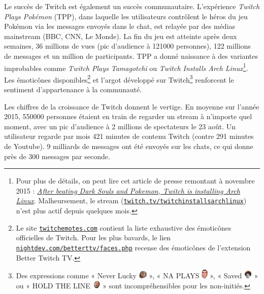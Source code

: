 \documentclass[a4paper]{article}
\begin{document}
Le succès de Twitch est également un succès communautaire. L'expérience \textit{Twitch Plays Pokémon} (TPP), dans laquelle les utilisateurs contrôlent le héros du jeu Pokémon via les messages envoyés dans le chat, est relayée par des médias mainstream (BBC, CNN, Le Monde). La fin du jeu est atteinte après deux semaines, 36 millions de vues (pic d'audience à 121000 personnes), 122 millions de messages et un million de participants\cite{Gadget2014}. TPP a donné naissance à des variantes improbables comme \textit{Twitch Plays Tamagotchi} ou \textit{Twitch Installs Arch Linux}\footnote{Pour plus de détails, on peut lire cet article de presse remontant à novembre 2015 : \href{http://www.pcworld.com/article/3001378/operating-systems/after-beating-dark-souls-and-pokemon-twitch-is-installing-arch-linux.html}{\textit{After beating Dark Souls and Pokemon, Twitch is installing Arch Linux}}. Malheursement, le stream (\href{https://www.twitch.tv/twitchinstallsarchlinux}{\texttt{twitch.tv/twitchinstallsarchlinux}}) n'est plus actif depuis quelques mois.}. Les émoticônes disponibles\footnote{Le site \href{https://twitchemotes.com/}{\texttt{twitchemotes.com}} contient la liste exhaustive des émoticônes officielles de Twitch. Pour les plus bavards, le lien \href{https://nightdev.com/betterttv/faces.php}{\texttt{nightdev.com/betterttv/faces.php}} recense des émoticônes de l'extension Better Twitch TV.} et l'argot développé sur Twitch\footnote{Des expressions comme « Never Lucky \includegraphics[width=0.4cm]{BabyRage.jpg} », « NA PLAYS \includegraphics[width=0.3cm]{4Head.png} », « Saved \includegraphics[width=0.4cm]{KappaRoss.png} » ou « HOLD THE LINE \includegraphics[width=0.4cm]{WutFace.png} » sont incompréhensibles pour les non-initiés.} renforcent le sentiment d'appartenance à la communauté. 

Les chiffres de la croissance de Twitch donnent le vertige. En moyenne sur l'année 2015, 550000 personnes étaient en train de regarder un stream à n'importe quel moment, avec un pic d'audience à 2 millions de spectateurs le 23 août. Un utilisateur regarde par mois 421 minutes de contenu Twitch (contre 291 minutes de Youtube). 9 milliards de messages ont été envoyés sur les chats, ce qui donne près de 300 messages par seconde\cite{Retro2015}.
\end{document}
